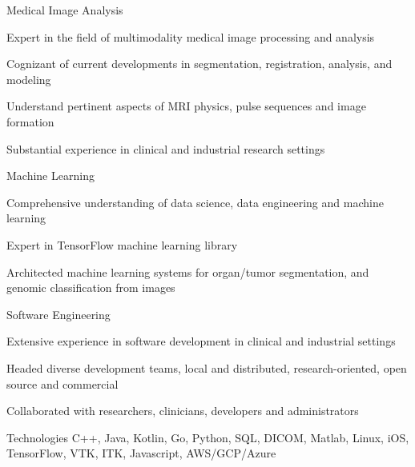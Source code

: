 
\begin{cvskills}


  \cvskill
    {Medical Image Analysis} %
    {
      \begin{cvitems}
      \item Expert in the field of multimodality medical image processing and analysis
      \item Cognizant of current developments in segmentation, registration, analysis, and modeling
      \item Understand pertinent aspects of MRI physics, pulse sequences and image formation
      \item Substantial experience in clinical and industrial research settings
      \end{cvitems}        
}
  \cvskill
    {Machine Learning} %
    {
      \begin{cvitems}
      \item Comprehensive understanding of data science, data engineering and machine learning
      \item Expert in TensorFlow machine learning library
        \item Architected machine learning systems for organ/tumor segmentation, and genomic classification from images
      \end{cvitems}
    }

    \cvskill
        {Software Engineering}
        {
          \begin{cvitems}
          \item Extensive experience in software development in clinical and industrial settings
          \item Headed diverse development teams, local and distributed, research-oriented, open source and commercial
          \item Collaborated with researchers, clinicians, developers and administrators
          \end{cvitems}
        }

    \cvskill
        {Technologies}
        {C++, Java, Kotlin, Go, Python, SQL, DICOM, Matlab, Linux, iOS, TensorFlow, VTK, ITK, Javascript, AWS/GCP/Azure}

    
\end{cvskills}
